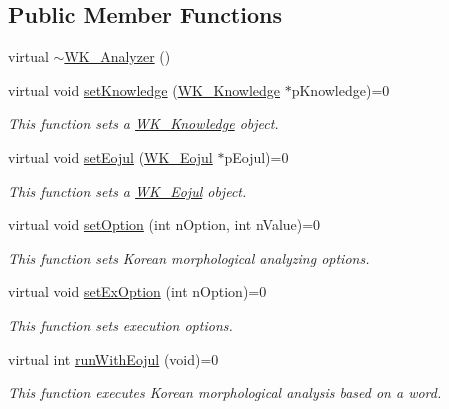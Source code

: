 \subsection*{Public Member Functions}
\begin{CompactItemize}
\item 
virtual \hyperlink{classWK__Analyzer_ef4b10cb9dd4554a77284179042a8384}{$\sim$WK\_\-Analyzer} ()
\item 
virtual void \hyperlink{classWK__Analyzer_fd2f8d851743bcab677133c6a8b28d29}{setKnowledge} (\hyperlink{classWK__Knowledge}{WK\_\-Knowledge} $\ast$pKnowledge)=0
\begin{CompactList}\small\item\em This function sets a \hyperlink{classWK__Knowledge}{WK\_\-Knowledge} object. \item\end{CompactList}\item 
virtual void \hyperlink{classWK__Analyzer_4c3350ac19c02b41670a3a96351fb684}{setEojul} (\hyperlink{classWK__Eojul}{WK\_\-Eojul} $\ast$pEojul)=0
\begin{CompactList}\small\item\em This function sets a \hyperlink{classWK__Eojul}{WK\_\-Eojul} object. \item\end{CompactList}\item 
virtual void \hyperlink{classWK__Analyzer_9f5685835cc61f22bee056e6bdfa002d}{setOption} (int nOption, int nValue)=0
\begin{CompactList}\small\item\em This function sets Korean morphological analyzing options. \item\end{CompactList}\item 
virtual void \hyperlink{classWK__Analyzer_679d58347c2630d002c5c57c549f9b83}{setExOption} (int nOption)=0
\begin{CompactList}\small\item\em This function sets execution options. \item\end{CompactList}\item 
virtual int \hyperlink{classWK__Analyzer_98f004c5f30d8fbe68a477c12666c4a6}{runWithEojul} (void)=0
\begin{CompactList}\small\item\em This function executes Korean morphological analysis based on a word. \item\end{CompactList}\item 

\end{CompactItemize}

